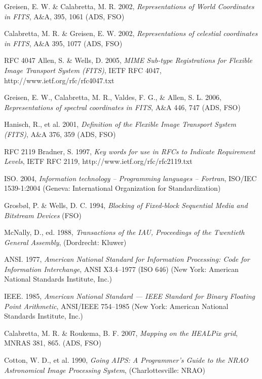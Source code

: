 \documentclass[11pt,makeidx]{book}     %
\begin{document}
\begin{thebibliography}{9999}
  Greisen, E. W. \& Calabretta, M. R. 2002,
{\it Representations of World Coordinates in FITS}, A\&A, 395, 1061 
(ADS, FSO)

  Calabretta, M. R. \& Greisen, E. W. 2002,
{\it Representations of celestial coordinates in FITS}, A\&A 395, 1077
(ADS, FSO)

 RFC 4047 Allen, S. \& Wells, D. 2005,
{\it MIME Sub-type Registrations for Flexible Image Transport System (FITS)},
IETF RFC 4047, http://www.ietf.org/rfc/rfc4047.txt

  Greisen, E. W., Calabretta, M. R., Valdes, F. G., \& Allen, S. L. 2006,
{\it Representations of spectral coordinates in FITS}, A\&A 446, 747
(ADS, FSO)

 Hanisch, R., et al. 2001, {\it Definition of the Flexible Image Transport
System (FITS)}, A\&A 376, 359  (ADS, FSO)

 RFC 2119 Bradner, S. 1997, {\it Key words for use in RFCs to Indicate 
Requirement Levels}, IETF RFC 2119, http://www.ietf.org/rfc/rfc2119.txt 

 ISO. 2004, {\it Information technology -- Programming 
      languages -- Fortran},  ISO/IEC 1539-1:2004 (Geneva: 
      International Organization for Standardization)

 Grosb\o l, P. \& Wells, D. C. 1994, {\it Blocking of Fixed-block
   Sequential Media and Bitstream Devices} (FSO)
   
 McNally, D., ed. 1988, {\it Transactions
 of the IAU, Proceedings of 
 the Twentieth General Assembly}, (Dordrecht: Kluwer)
  

 ANSI. 1977, {\it American National Standard for Information Processing:
      Code for Information Interchange},
      ANSI X3.4--1977 (ISO 646) (New York: American National 
      Standards
      Institute, Inc.)

  IEEE. 1985, {\it American National Standard --- 
       IEEE Standard for Binary 
       Floating Point Arithmetic}, ANSI/IEEE 754--1985 
       (New York: American
        National Standards Institute, Inc.)

 Calabretta, M. R. \& Roukema, B. F. 2007,
{\it Mapping on the HEALPix grid}, MNRAS 381, 865.
(ADS, FSO)

 Cotton, W. D., et al. 1990, {\it Going AIPS: A Programmer's Guide
to the NRAO Astronomical Image Processing System},  (Charlottesville: NRAO)


\end{thebibliography}


\ifindex
  
\fi

\end{document}
